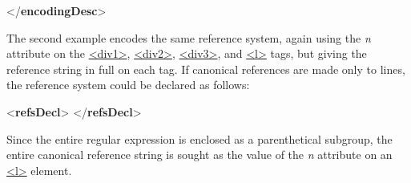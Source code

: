 \begin{shaded}
\hspace*{1em}\mbox{}\newline 
{}\mbox{}\newline 
{</\textbf{encodingDesc}>}\end{shaded}\egroup\par \par
The second example encodes the same reference system, again using the {\itshape n} attribute on the \hyperref[TEI.div1]{<div1>}, \hyperref[TEI.div2]{<div2>}, \hyperref[TEI.div3]{<div3>}, and \hyperref[TEI.l]{<l>} tags, but giving the reference string in full on each tag. If canonical references are made only to lines, the reference system could be declared as follows: \par\bgroup{}\exampleFont \begin{shaded}\noindent\mbox{}{<\textbf{refsDecl}>}\mbox{}\newline 
\hspace*{1em}{<\textbf{cRefPattern}\hspace*{1em}{matchPattern}="{([\textasciicircum  ]+ [0-9]+⃥.[0-9]+⃥.[0-9]+)}"\mbox{}\newline 
\hspace*{1em}\hspace*{1em}{replacementPattern}="{\#xpath(//l[@n='\$1')}"/>}\mbox{}\newline 
{</\textbf{refsDecl}>}\end{shaded}\egroup\par \noindent  Since the entire regular expression is enclosed as a parenthetical subgroup, the entire canonical reference string is sought as the value of the {\itshape n} attribute on an \hyperref[TEI.l]{<l>} element.\par
